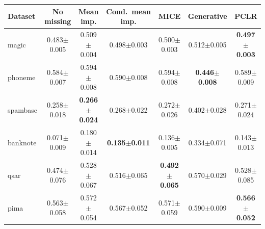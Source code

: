 \begin{tabular}{lcccccc}
\toprule
Dataset & No missing & Mean imp. & Cond.\ mean imp. & MICE & Generative & PCLR \\
\midrule
magic & 0.483{\scriptsize$\pm$0.005} & 0.509{\scriptsize$\pm$0.004} & 0.498{\scriptsize$\pm$0.003} & 0.500{\scriptsize$\pm$0.003} & 0.512{\scriptsize$\pm$0.005} & \textbf{0.497{\scriptsize$\pm$0.003}} \\
phoneme & 0.584{\scriptsize$\pm$0.007} & 0.594{\scriptsize$\pm$0.008} & 0.590{\scriptsize$\pm$0.008} & 0.594{\scriptsize$\pm$0.008} & \textbf{0.446{\scriptsize$\pm$0.008}} & 0.589{\scriptsize$\pm$0.009} \\
spambase & 0.258{\scriptsize$\pm$0.018} & \textbf{0.266{\scriptsize$\pm$0.024}} & 0.268{\scriptsize$\pm$0.022} & 0.272{\scriptsize$\pm$0.026} & 0.402{\scriptsize$\pm$0.028} & 0.271{\scriptsize$\pm$0.024} \\
banknote & 0.071{\scriptsize$\pm$0.009} & 0.180{\scriptsize$\pm$0.014} & \textbf{0.135{\scriptsize$\pm$0.011}} & 0.136{\scriptsize$\pm$0.005} & 0.334{\scriptsize$\pm$0.071} & 0.143{\scriptsize$\pm$0.013} \\
qsar & 0.474{\scriptsize$\pm$0.076} & 0.528{\scriptsize$\pm$0.067} & 0.516{\scriptsize$\pm$0.065} & \textbf{0.492{\scriptsize$\pm$0.065}} & 0.570{\scriptsize$\pm$0.029} & 0.528{\scriptsize$\pm$0.085} \\
pima & 0.563{\scriptsize$\pm$0.058} & 0.572{\scriptsize$\pm$0.054} & 0.567{\scriptsize$\pm$0.052} & 0.571{\scriptsize$\pm$0.059} & 0.590{\scriptsize$\pm$0.009} & \textbf{0.566{\scriptsize$\pm$0.052}} \\
\bottomrule
\end{tabular}
